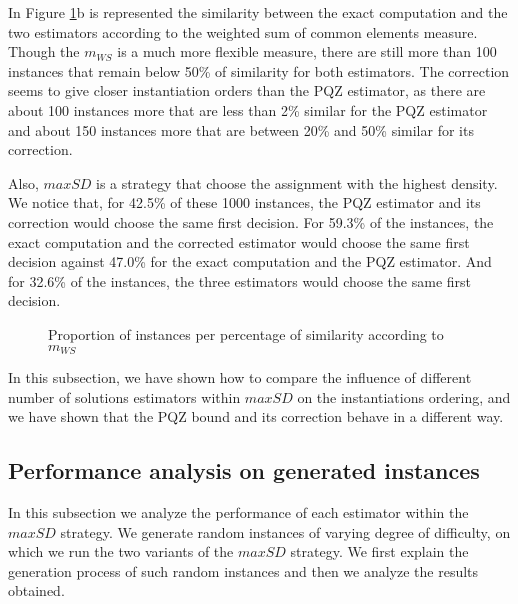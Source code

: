 \documentclass[jair,twoside,11pt,theapa]{article}
\begin{document}
In Figure \ref{similarityWCS}b is represented the similarity between the exact computation and the two estimators according to the weighted sum of common elements measure. Though the $m_{WS}$ is a much more flexible measure, there are still more than 100 instances that remain below 50\% of similarity for both estimators. The correction seems to give closer instantiation orders than the PQZ estimator, as there are about 100 instances more that are less than 2\% similar for the PQZ estimator and about 150 instances more that are between 20\% and 50\% similar for its correction.

Also, $maxSD$ is a strategy that choose the assignment with the highest density. We notice that, for 42.5\% of these 1000 instances, the PQZ estimator and its correction would choose the same first decision. For 59.3\% of the instances, the exact computation and the corrected estimator would choose the same first decision against 47.0\% for the exact computation and the PQZ estimator. And for 32.6\% of the instances, the three estimators would choose the same first decision.

\begin{figure}
  \begin{minipage}[c]{.46\linewidth}
     	 
	\end{minipage} \hfill
	\begin{minipage}[c]{.46\linewidth}
     	 
  	\end{minipage}
    \caption{Proportion of instances per percentage of similarity according to $m_{WS}$}
    \label{similarityWCS}
\end{figure}



In this subsection, we have shown how to compare the influence of different number of solutions estimators within $maxSD$ on the instantiations ordering, and we have shown that the PQZ bound and its correction behave in a different way.

\subsection{Performance analysis on generated instances}
\label{experimentalPerformance}

In this subsection we analyze the performance of each estimator within the $maxSD$ strategy. We generate random instances of varying degree of difficulty, on which we run the two variants of the $maxSD$ strategy. We first explain the generation process of such random instances and then we analyze the results obtained.
\end{document}
